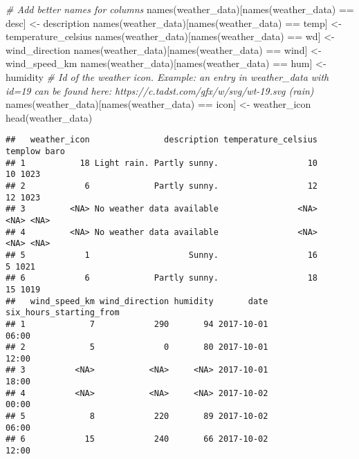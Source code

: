\documentclass[
]{article}
\newenvironment{Shaded}{\begin{snugshade}}{\end{snugshade}}
\newcommand{\CommentTok}[1]{\textcolor[rgb]{0.56,0.35,0.01}{\textit{#1}}}
\newcommand{\FunctionTok}[1]{\textcolor[rgb]{0.00,0.00,0.00}{#1}}
\newcommand{\NormalTok}[1]{#1}
\newcommand{\OtherTok}[1]{\textcolor[rgb]{0.56,0.35,0.01}{#1}}
\newcommand{\SpecialCharTok}[1]{\textcolor[rgb]{0.00,0.00,0.00}{#1}}
\newcommand{\StringTok}[1]{\textcolor[rgb]{0.31,0.60,0.02}{#1}}
\begin{document}
\begin{Shaded}
\begin{Highlighting}[]
\CommentTok{\# Add better names for columns}
\FunctionTok{names}\NormalTok{(weather\_data)[}\FunctionTok{names}\NormalTok{(weather\_data) }\SpecialCharTok{==} \StringTok{\textquotesingle{}desc\textquotesingle{}}\NormalTok{] }\OtherTok{\textless{}{-}} \StringTok{\textquotesingle{}description\textquotesingle{}}
\FunctionTok{names}\NormalTok{(weather\_data)[}\FunctionTok{names}\NormalTok{(weather\_data) }\SpecialCharTok{==} \StringTok{\textquotesingle{}temp\textquotesingle{}}\NormalTok{] }\OtherTok{\textless{}{-}} \StringTok{\textquotesingle{}temperature\_celsius\textquotesingle{}}
\FunctionTok{names}\NormalTok{(weather\_data)[}\FunctionTok{names}\NormalTok{(weather\_data) }\SpecialCharTok{==} \StringTok{\textquotesingle{}wd\textquotesingle{}}\NormalTok{] }\OtherTok{\textless{}{-}} \StringTok{\textquotesingle{}wind\_direction\textquotesingle{}}
\FunctionTok{names}\NormalTok{(weather\_data)[}\FunctionTok{names}\NormalTok{(weather\_data) }\SpecialCharTok{==} \StringTok{\textquotesingle{}wind\textquotesingle{}}\NormalTok{] }\OtherTok{\textless{}{-}} \StringTok{\textquotesingle{}wind\_speed\_km\textquotesingle{}}
\FunctionTok{names}\NormalTok{(weather\_data)[}\FunctionTok{names}\NormalTok{(weather\_data) }\SpecialCharTok{==} \StringTok{\textquotesingle{}hum\textquotesingle{}}\NormalTok{] }\OtherTok{\textless{}{-}} \StringTok{\textquotesingle{}humidity\textquotesingle{}}
\CommentTok{\# Id of the weather icon. Example: an entry in weather\_data with id=19 can be found here: https://c.tadst.com/gfx/w/svg/wt{-}19.svg (rain)}
\FunctionTok{names}\NormalTok{(weather\_data)[}\FunctionTok{names}\NormalTok{(weather\_data) }\SpecialCharTok{==} \StringTok{\textquotesingle{}icon\textquotesingle{}}\NormalTok{] }\OtherTok{\textless{}{-}} \StringTok{\textquotesingle{}weather\_icon\textquotesingle{}}
\FunctionTok{head}\NormalTok{(weather\_data)}
\end{Highlighting}
\end{Shaded}

\begin{verbatim}
##   weather_icon               description temperature_celsius templow baro
## 1           18 Light rain. Partly sunny.                  10      10 1023
## 2            6             Partly sunny.                  12      12 1023
## 3         <NA> No weather data available                <NA>    <NA> <NA>
## 4         <NA> No weather data available                <NA>    <NA> <NA>
## 5            1                    Sunny.                  16       5 1021
## 6            6             Partly sunny.                  18      15 1019
##   wind_speed_km wind_direction humidity       date six_hours_starting_from
## 1             7            290       94 2017-10-01                   06:00
## 2             5              0       80 2017-10-01                   12:00
## 3          <NA>           <NA>     <NA> 2017-10-01                   18:00
## 4          <NA>           <NA>     <NA> 2017-10-02                   00:00
## 5             8            220       89 2017-10-02                   06:00
## 6            15            240       66 2017-10-02                   12:00
\end{verbatim}
\end{document}
